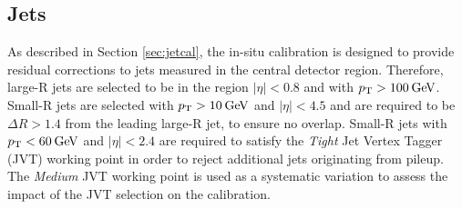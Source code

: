 \subsection{Jets}
As described in Section \ref{sec:jetcal}, the \zjets in-situ calibration is designed to provide residual corrections to jets measured in the central detector region. Therefore, large-R jets are selected to be in the region $|\eta|<0.8$ and with $p_{\text{T}}>100\hspace{2pt}\text{Ge\kern -0.1em V}$. Small-R jets are selected with $p_{\text{T}}>10\hspace{2pt}\text{Ge\kern -0.1em V}$ and $|\eta|<4.5$ and are required to be $\Delta R>1.4$ from the leading large-R jet, to ensure no overlap. Small-R jets with $p_{\text{T}}<60\hspace{2pt}\text{Ge\kern -0.1em V}$ and $|\eta|<2.4$ are required to satisfy the \textit{Tight} Jet Vertex Tagger (JVT) \cite{Insitu:JVT} working point in order to reject additional jets originating from pileup. The \textit{Medium} JVT working point is used as a systematic variation to assess the impact of the JVT selection on the calibration. %

